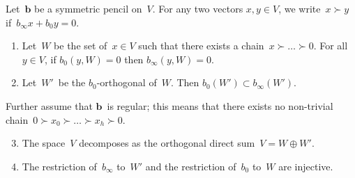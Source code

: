 \documentclass{article}%
\begin{document}
\begin{lem}\label{lem:finite}%
Let~$\bm{b}$ be a symmetric pencil on~$V$. For any two vectors
$x,y ∈ V$, we write~$x ≻ y$ if~$b_{∞} x + b_0 y = 0$.
\begin{enumerate}
\item Let~$W$ be the set of~$x ∈ V$ such that there exists a chain~$x ≻ …
≻ 0$. For all~$y ∈ V$, if $b_0(y, W) = 0$ then $b_{∞}(y, W) = 0$.
\item Let~$W'$~be the $b_0$-orthogonal of~$W$. Then $b_0(W') ⊂ b_{∞}
(W')$.
\end{enumerate}
Further assume that $\bm{b}$~is regular; this means that there exists no
non-trivial chain~$0 ≻ x_0 ≻ … ≻ x_h ≻ 0$.
\begin{enumerate}
\setcounter{enumi}{2}
\item The space~$V$ decomposes as the orthogonal direct sum~$V = W ⊕ W'$.
\item The restriction of~$b_{∞}$ to~$W'$ and the restriction of~$b_{0}$
to~$W$ are injective.
\end{enumerate}
\end{lem}
\end{document}
